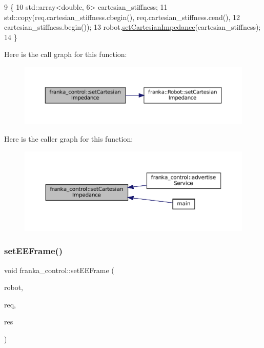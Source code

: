 \begin{DoxyCode}
9                                                              \{
10   std::array<double, 6> cartesian\_stiffness;
11   std::copy(req.cartesian\_stiffness.cbegin(), req.cartesian\_stiffness.cend(),
12             cartesian\_stiffness.begin());
13   robot.\hyperlink{classfranka_1_1Robot_ac2678c5c31cc8c0627ecda7485f81f6d}{setCartesianImpedance}(cartesian\_stiffness);
14 \}
\end{DoxyCode}
Here is the call graph for this function\+:
\nopagebreak
\begin{figure}[H]
\begin{center}
\leavevmode
\includegraphics[width=350pt]{namespacefranka__control_a6c82cc16e5790da8663f879332670421_cgraph}
\end{center}
\end{figure}
Here is the caller graph for this function\+:
\nopagebreak
\begin{figure}[H]
\begin{center}
\leavevmode
\includegraphics[width=350pt]{namespacefranka__control_a6c82cc16e5790da8663f879332670421_icgraph}
\end{center}
\end{figure}
\mbox{\label{namespacefranka__control_aaab1e3e96b01a8589336c39998422dad}} 
\subsubsection{\texorpdfstring{set\+E\+E\+Frame()}{setEEFrame()}}
{\footnotesize\ttfamily void franka\+\_\+control\+::set\+E\+E\+Frame (\begin{DoxyParamCaption}\item[{\hyperlink{classfranka_1_1Robot}{franka\+::\+Robot} \&}]{robot,  }\item[{const Set\+E\+E\+Frame\+::\+Request \&}]{req,  }\item[{Set\+E\+E\+Frame\+::\+Response \&}]{res }\end{DoxyParamCaption})}



